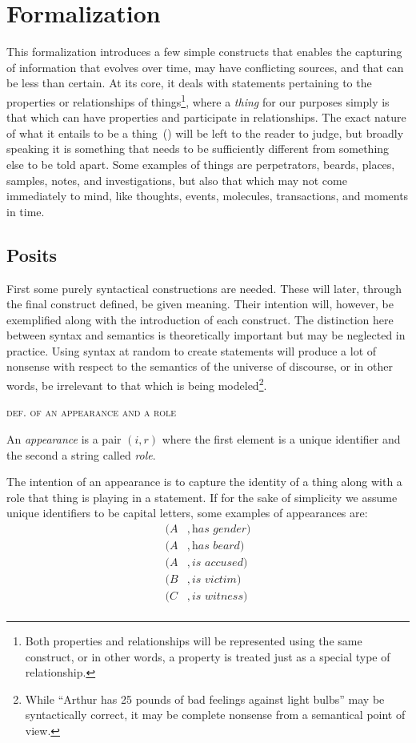 \documentclass[sfsidenotes,nobib,twoside,symmetric]{tufte-handout}
\renewcommand{\parencite}[2][0pt]{(\citeauthor{#2})\sidenote[][#1]{\fullcite{#2}}}
\newcounter{majorcount}
\newcommand{\deffy}[3]{
	\vspace{2ex}
	\refstepcounter{majorcount} 
	\noindent\textsc{#1}%
	\\\begin{small}
	\noindent #2%
	\label{Def:#3}
	\end{small}
	\vspace{2ex}
}
\begin{document}
\section{Formalization}
\label{c:Formalization}
%
This formalization introduces a few simple constructs that enables the capturing of information that evolves over time, may have conflicting sources, and that can be less than certain. At its core, it deals with statements pertaining to the properties or relationships of things\footnote{Both properties and relationships will be represented using the same construct, or in other words, a property is treated just as a special type of relationship.}, where a \emph{thing} for our purposes simply is that which can have properties and participate in relationships. The exact nature of what it entails to be a thing~\parencite{CummingEtAl} will be left to the reader to judge, but broadly speaking it is something that needs to be sufficiently different from something else to be told apart. Some examples of things are perpetrators, beards, places, samples, notes, and investigations, but also that which may not come immediately to mind, like thoughts, events, molecules, transactions, and moments in time.

\subsection{Posits}
%
First some purely syntactical constructions are needed. These will later, through the final construct defined, be given meaning. Their intention will, however, be exemplified along with the introduction of each construct. The distinction here between syntax and semantics is theoretically important but may be neglected in practice. Using syntax at random to create statements will produce a lot of nonsense with respect to the semantics of the universe of discourse, or in other words, be irrelevant to that which is being modeled\footnote{While \enquote{Arthur has 25 pounds of bad feelings against light bulbs} may be syntactically correct, it may be complete nonsense from a semantical point of view.}. 

\deffy{def. of an appearance and a role}{%
An \emph{appearance} is a pair $(i, r)$ where the first element is a unique identifier and the second a string called \emph{role}.}{appearance}

The intention of an appearance is to capture the identity of a thing along with a role that thing is playing in a statement. If for the sake of simplicity we assume unique identifiers to be capital letters, some examples of appearances are: 
\begin{align*}
(A&, \textit{has gender}) \\
(A&, \textit{has beard}) \\
(A&, \textit{is accused}) \\
(B&, \textit{is victim}) \\
(C&, \textit{is witness}) \\
\end{align*}
\end{document}

